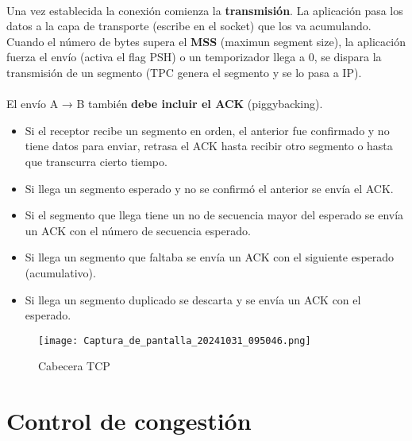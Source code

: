 \documentclass{article}
\begin{document}
\\

Una vez establecida la conexión comienza la \textbf{transmisión}. La aplicación pasa los datos a la capa de transporte (escribe en el socket) que los va acumulando. Cuando el número de bytes supera el \textbf{MSS} (maximun segment size), la aplicación fuerza el envío (activa el flag PSH) o un temporizador llega a 0, se dispara la transmisión de un segmento (TPC genera el segmento y se lo pasa a IP). \\
\\
El envío A → B también \textbf{debe incluir el ACK} (piggybacking). 
\begin{itemize}
    \item Si el receptor recibe un segmento en orden, el anterior fue confirmado y no tiene datos para enviar, retrasa el ACK hasta recibir otro segmento o hasta que transcurra cierto tiempo.
    
    \item Si llega un segmento esperado y no se confirmó el anterior se envía el ACK.
    
    \item Si el segmento que llega tiene un no de secuencia mayor del esperado se envía un ACK con el número de secuencia esperado.
    
    \item Si llega un segmento que faltaba se envía un ACK con el siguiente esperado (acumulativo).
    
    \item Si llega un segmento duplicado se descarta y se envía un ACK con el esperado.
\end{itemize}

\begin{figure}[h]
    \centering
    \texttt{[image: Captura\_de\_pantalla\_20241031\_095046.png]} %
    \caption{Cabecera TCP}
    \label{fig:etiqueta}
\end{figure}

\newpage

\section{Control de congestión}
\end{document}
